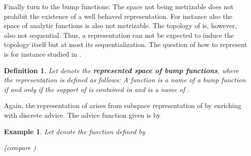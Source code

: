 \documentclass{eptcs-modified}
\newtheorem{definition}[theorem]{Definition}
\newtheorem{example}[theorem]{Example}
\newcommand{\demph}{\textbf}
\begin{document}
			Finally turn to the bump functions:
			The space  not being metrizable does not prohibit the existence of a well behaved representation.
			For instance also the space  of analytic functions is also not metrizable.
			The topology of  is, however, also not sequential.
			Thus, a representation can not be expected to induce the topology itself but at most its sequentialization.
			The question of how to represent  is for instance studied in \cite{zhong,MR2207129}.
			\begin{definition}\label{def:bump function representation}
				Let  denote the \demph{represented space of bump functions}, where the representation is defined as follows: A function  is a name of a bump function  if and only if the support of  is contained in  and  is a name of .
			\end{definition}
			\noindent\begin{minipage}{.55\textwidth}
				Again, the representation of  arises from subspace representation of  by enriching with discrete advice.
				The advice function given is by
				
				\begin{example}\label{ex:a bump function}
					Let  denote the function defined by
					
					(compare )
				\end{example}
			\end{minipage}
			\begin{minipage}{.4\textwidth}
				\label{fig:the bump function f}
			\end{minipage}
\end{document}
